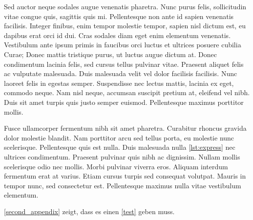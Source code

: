 \documentclass[%
    auto-generate   = true,             %
    debug           = true,             %
    print-ndn       = true,             %
    print-loa       = true,             %
    print-lof       = true,             %
    print-lot       = true,             %
    print-lol       = true,             %
    bib-file        = literature.bib,   %
    plantuml        = true,             %
    title-style     = default,          %
    font-size       = 12pt              %
]{udhbwvst}
\begin{document}
Sed auctor neque sodales augue venenatis pharetra. Nunc purus felis, sollicitudin vitae congue quis, sagittis quis mi. Pellentesque non ante id sapien venenatis facilisis. Integer finibus, enim tempor molestie tempor, sapien nisl dictum est, eu dapibus erat orci id dui. Cras sodales diam eget enim elementum venenatis. Vestibulum ante ipsum primis in faucibus orci luctus et ultrices posuere cubilia Curae; Donec mattis tristique purus, ut luctus augue dictum at. Donec condimentum lacinia felis, sed cursus tellus pulvinar vitae. Praesent aliquet felis ac vulputate malesuada. Duis malesuada velit vel dolor facilisis facilisis. Nunc laoreet felis in egestas semper. Suspendisse nec lectus mattis, lacinia ex eget, commodo neque. Nam nisl neque, accumsan suscipit pretium at, eleifend vel nibh. Duis sit amet turpis quis justo semper euismod. Pellentesque maximus porttitor mollis.


Fusce ullamcorper fermentum nibh sit amet pharetra. Curabitur rhoncus gravida dolor molestie blandit. Nam porttitor arcu sed tellus porta, eu molestie nunc scelerisque. Pellentesque quis est nulla. Duis malesuada nulla \autoref{lst:express} nec ultrices condimentum. Praesent pulvinar quis nibh ac dignissim. Nullam mollis scelerisque odio nec mollis. Morbi pulvinar viverra eros. Aliquam interdum fermentum erat at varius. Etiam cursus turpis sed consequat volutpat. Mauris in tempor nunc, sed consectetur est. Pellentesque maximus nulla vitae vestibulum elementum. 

\blinddocument

\autoref{second_appendix} zeigt, dass es einen \autoref{test} geben muss.

\begin{dhbwappendices}

    \lipsum

    \lipsum

\end{dhbwappendices}
\end{document}
